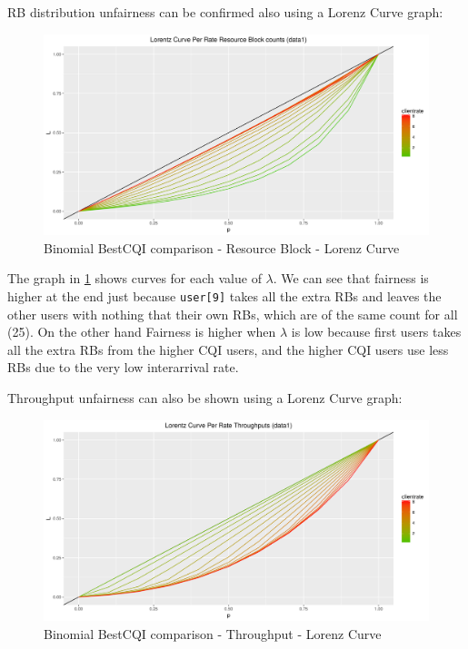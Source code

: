 RB distribution unfairness can be confirmed also using a Lorenz Curve graph:
\begin{figure}[H]
  \includegraphics[width=1\textwidth]{images/lorallrb-binombest.png}
  \caption{Binomial BestCQI comparison - Resource Block - Lorenz Curve}
  \label{fig:lorallrb-binombest}
\end{figure}
The graph in \ref{fig:lorallrb-binombest} shows curves for each value of \(\lambda\). We can see that fairness is higher at the end just because \texttt{user[9]} takes all the extra RBs and leaves the other users with nothing that their own RBs, which are of the same count for all (25). On the other hand Fairness is higher when \(\lambda\) is low because first users takes all the extra RBs from the higher CQI users, and the higher CQI users use less RBs due to the very low interarrival rate.

Throughput unfairness can also be shown using a Lorenz Curve graph:
\begin{figure}[H]
  \includegraphics[width=1\textwidth]{images/lorallth-binombest.png}
  \caption{Binomial BestCQI comparison - Throughput - Lorenz Curve}
  \label{fig:lorallth-binombest}
\end{figure}

